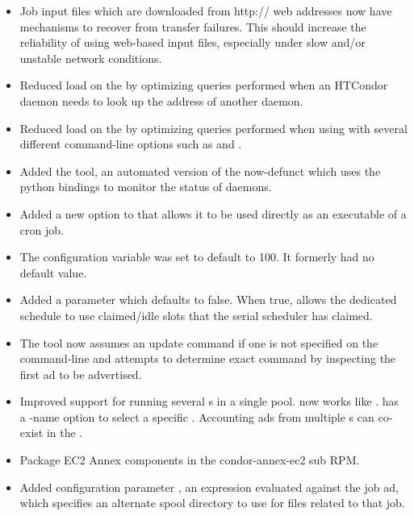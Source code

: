 \begin{itemize}
\item Job input files which are downloaded from http:// web addresses now
have mechanisms to recover from transfer failures. This should increase the
reliability of using web-based input files, especially under slow and/or
unstable network conditions.

\item Reduced load on the  by optimizing queries performed when
an HTCondor daemon needs to look up the address of another daemon.

\item Reduced load on the  by optimizing queries performed
when using  with several different command-line options such as
 and .

\item Added the  tool,
an automated version of the now-defunct 
which uses the python bindings to monitor the status of daemons.

\item Added a new option  to  that allows it to be
used directly as an executable of a  cron job.

\item The configuration variable 
was set to default to 100. It formerly had no default value.

\item Added a parameter  which
defaults to false.  When true, allows the dedicated schedule to use claimed/idle
slots that the serial scheduler has claimed.

\item The  tool now assumes an update command if one is not
specified on the command-line and attempts to determine exact command by
inspecting the first ad to be advertised.

\item Improved support for running several s in a
single pool.
 now works like .
 has a -name option to select a specific
.
Accounting ads from multiple s can co-exist in the
.

\item Package EC2 Annex components in the condor-annex-ec2 sub RPM.

\item Added configuration parameter ,
an expression evaluated against the job ad, which specifies an alternate
spool directory to use for files related to that job.

\end{itemize}

